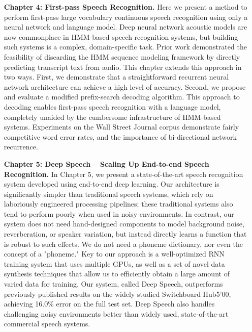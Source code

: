 \begin{itemize}
    \item [{\bf Chapter 4:}]{\bf First-pass Speech Recognition.} Here we present
        a method to perform first-pass large vocabulary continuous speech
        recognition using only a neural network and language model. Deep neural
        network acoustic models are now commonplace in HMM-based speech
        recognition systems, but building such systems is a complex,
        domain-specific task. Prior work demonstrated the feasibility of
        discarding the HMM sequence modeling framework by directly predicting
        transcript text from audio. This chapter extends this approach in two
        ways. First, we demonstrate that a straightforward recurrent neural
        network architecture can achieve a high level of accuracy. Second, we
        propose and evaluate a modified prefix-search decoding algorithm. This
        approach to decoding enables first-pass speech recognition with a
        language model, completely unaided by the cumbersome infrastructure of
        HMM-based systems. Experiments on the Wall Street Journal corpus
        demonstrate fairly competitive word error rates, and the importance of
        bi-directional network recurrence. 

    \item [{\bf Chapter 5:}]{\bf Deep Speech -- Scaling Up End-to-end Speech
        Recognition.} In Chapter 5, we present a state-of-the-art speech
        recognition system developed using end-to-end deep learning. Our
        architecture is significantly simpler than traditional speech systems,
        which rely on laboriously engineered processing pipelines; these
        traditional systems also tend to perform poorly when used in noisy
        environments. In contrast, our system does not need hand-designed
        components to model background noise, reverberation, or speaker
        variation, but instead directly learns a function that is robust to
        such effects. We do not need a phoneme dictionary, nor even the concept
        of a "phoneme." Key to our approach is a well-optimized RNN training
        system that uses multiple GPUs, as well as a set of novel data
        synthesis techniques that allow us to efficiently obtain a large amount
        of varied data for training. Our system, called Deep Speech,
        outperforms previously published results on the widely studied
        Switchboard Hub5'00, achieving 16.0\% error on the full test set. Deep
        Speech also handles challenging noisy environments better than widely
        used, state-of-the-art commercial speech systems.


\end{itemize}
